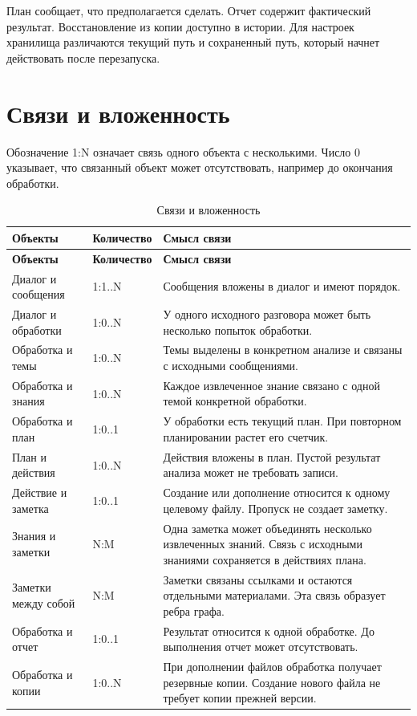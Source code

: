План сообщает, что предполагается сделать. Отчет содержит фактический результат. Восстановление из копии доступно в истории. Для настроек хранилища различаются текущий путь и сохраненный путь, который начнет действовать после перезапуска.


\clearpage
\section{Связи и вложенность}

Обозначение 1:N означает связь одного объекта с несколькими. Число 0 указывает, что связанный объект может отсутствовать, например до окончания обработки.


{\small\setlength{\tabcolsep}{5pt}\renewcommand{\arraystretch}{1.12}
\begin{longtable}{L{42mm}L{23mm}L{\dimexpr{}\tabcolsep-65mm\relax}}
\caption{Связи и вложенность}\\
\toprule
\textbf{Объекты} & \textbf{Количество} & \textbf{Смысл связи} \\
\midrule\endfirsthead
\toprule
\textbf{Объекты} & \textbf{Количество} & \textbf{Смысл связи} \\
\midrule\endhead
\bottomrule\endfoot
Диалог и сообщения & 1:1..N & Сообщения вложены в диалог и имеют порядок. \\[6pt]
Диалог и обработки & 1:0..N & У одного исходного разговора может быть несколько попыток обработки. \\[6pt]
Обработка и темы & 1:0..N & Темы выделены в конкретном анализе и связаны с исходными сообщениями. \\[6pt]
Обработка и знания & 1:0..N & Каждое извлеченное знание связано с одной темой конкретной обработки. \\[6pt]
Обработка и план & 1:0..1 & У обработки есть текущий план. При повторном планировании растет его счетчик. \\[6pt]
План и действия & 1:0..N & Действия вложены в план. Пустой результат анализа может не требовать записи. \\[6pt]
Действие и заметка & 1:0..1 & Создание или дополнение относится к одному целевому файлу. Пропуск не создает заметку. \\[6pt]
Знания и заметки & N:M & Одна заметка может объединять несколько извлеченных знаний. Связь с исходными знаниями сохраняется в действиях плана. \\[6pt]
Заметки между собой & N:M & Заметки связаны ссылками и остаются отдельными материалами. Эта связь образует ребра графа. \\[6pt]
Обработка и отчет & 1:0..1 & Результат относится к одной обработке. До выполнения отчет может отсутствовать. \\[6pt]
Обработка и копии & 1:0..N & При дополнении файлов обработка получает резервные копии. Создание нового файла не требует копии прежней версии. \\[6pt]
\end{longtable}}

